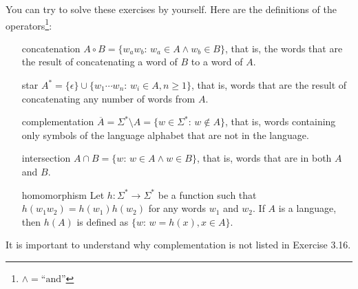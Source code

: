 \documentclass{article}
\newcommand{\0}{\texttt{\textvisiblespace}}
\newcommand{\°}{\obullet{\0}}
\newcommand{\st}{\colon\,}
\begin{document}
You can try to solve these exercises by yourself. Here are the definitions of
the operators\footnote{\(\land = \text{``and''}\)}:
\begin{itemize}
\item[concatenation] \( A \circ B = \{ w_a w_b \st w_a \in A \land w_b \in
	B\}\), that is, the
	words that are the result of concatenating a word of \(B\) to a word of
	\(A\).
\item[star] \( A^* = \{ \epsilon \} \cup \{ w_1 \cdots w_n \st w_i \in A, n \ge
	1\}\), that is,
	words that are the result of concatenating any number of words from \(A\).
\item[complementation] \( \overline{A} = \Sigma^{*} \setminus A = \{ w \in \Sigma^{*} \st w \not \in A
	\}\), that is, words containing only symbols of the language alphabet that are not in the
	language.
\item[intersection] \( A \cap B = \{w \st w \in A \land w \in B\}\), that
	is, words that are in both \(A\) and \(B\).
\item[homomorphism] Let \(h \colon \Sigma^{*} \to \Sigma^{*}\)
	be a function such that \(h(w_1 w_2) = h(w_1) h(w_2)\) for any words
	\(w_1\) and \(w_2\). If \(A\) is
	a language, then \(h(A)\) is defined as \(\{ w \st w = h(x), x \in A\}\).
\end{itemize}

It is important to understand why complementation is not listed in Exercise 3.16.
\end{document}
